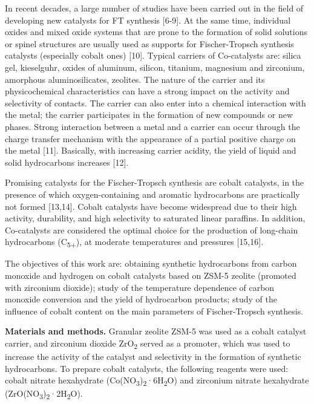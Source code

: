In recent decades, a large number of studies have been carried out in
the field of developing new catalysts for FT synthesis {[}6-9{]}. At the
same time, individual oxides and mixed oxide systems that are prone to
the formation of solid solutions or spinel structures are usually used
as supports for Fischer-Tropsch synthesis catalysts (especially cobalt
ones) {[}10{]}. Typical carriers of Co-catalysts are: silica gel,
kieselguhr, oxides of aluminum, silicon, titanium, magnesium and
zirconium, amorphous aluminosilicates, zeolites. The nature of the
carrier and its physicochemical characteristics can have a strong impact
on the activity and selectivity of contacts. The carrier can also enter
into a chemical interaction with the metal; the carrier participates in
the formation of new compounds or new phases. Strong interaction between
a metal and a carrier can occur through the charge transfer mechanism
with the appearance of a partial positive charge on the metal {[}11{]}.
Basically, with increasing carrier acidity, the yield of liquid and
solid hydrocarbons increases {[}12{]}.

Promising catalysts for the Fischer-Tropsch synthesis are cobalt
catalysts, in the presence of which oxygen-containing and aromatic
hydrocarbons are practically not formed {[}13,14{]}. Cobalt catalysts
have become widespread due to their high activity, durability, and high
selectivity to saturated linear paraffins. In addition, Co-catalysts are
considered the optimal choice for the production of long-chain
hydrocarbons (C\textsubscript{5+}), at moderate temperatures and
pressures {[}15,16{]}.

The objectives of this work are: obtaining synthetic hydrocarbons from
carbon monoxide and hydrogen on cobalt catalysts based on ZSM-5 zeolite
(promoted with zirconium dioxide); study of the temperature dependence
of carbon monoxide conversion and the yield of hydrocarbon products;
study of the influence of cobalt content on the main parameters of
Fischer-Tropsch synthesis.

{\bfseries Materials and methods.} Granular zeolite ZSM-5 was used as a
cobalt catalyst carrier, and zirconium dioxide ZrO\textsubscript{2}
served as a promoter, which was used to increase the activity of the
catalyst and selectivity in the formation of synthetic hydrocarbons. To
prepare cobalt catalysts, the following reagents were used: cobalt
nitrate hexahydrate
(Co(NO\textsubscript{3})\textsubscript{2}·6H\textsubscript{2}O) and
zirconium nitrate hexahydrate
(ZrO(NO\textsubscript{3})\textsubscript{2}·2H\textsubscript{2}O).


